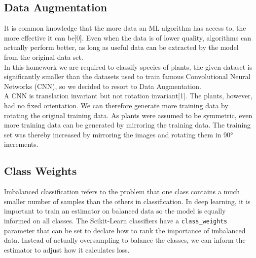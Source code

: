 \documentclass[11pt, oneside]{article}
\begin{document}
\subsection{Data Augmentation}
It is common knowledge that the more data an ML algorithm has access to, the more effective it can be[0]. Even when the data is of lower quality, algorithms can actually perform better, as long as useful data can be extracted by the model from the original data set.\\
In this homework we are required to classify species of plants, the given dataset is significantly smaller than the datasets used to train famous Convolutional Neural Networks (CNN), so we decided to resort to Data Augmentation. \\
A CNN is translation invariant but not rotation invariant[1]. The plants, however, had no fixed orientation. We can therefore generate more training data by rotating the original training data. As plants were assumed to be symmetric, even more training data can be generated by mirroring the training data. The training set was thereby increased by mirroring the images and rotating them in 90° increments. 
\subsection{Class Weights}
Imbalanced classification refers to the problem that one class contains a much smaller number of samples than the others in classification. In deep learning, it is important to train an estimator on balanced data so the model is equally informed on all classes. The Scikit-Learn classifiers have a \texttt{class\_weights} parameter that can be set to declare how to rank the importance of imbalanced data. Instead of actually oversampling to balance the classes, we can inform the estimator to adjust how it calculates loss.
\end{document}
